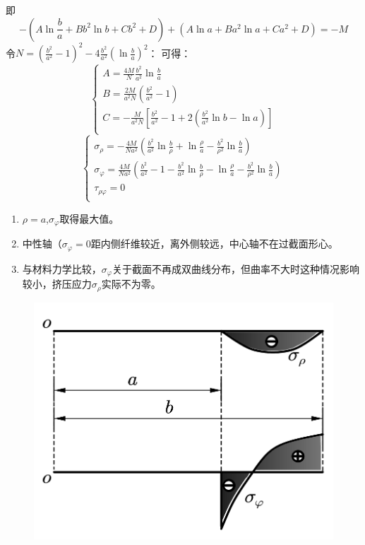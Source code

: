 即\[-\left( A\ln \frac{b}{a}+Bb^2\ln b+Cb^2+D \right) +\left( A\ln a+Ba^2\ln a+Ca^2+D \right) =-M\]
令$N=\left( \frac{b^2}{a^2}-1 \right) ^2-4\frac{b^2}{a^2}\left( \ln \frac{b}{a} \right) ^2$：
可得：\[\begin{cases}
A=\frac{4M}{N}\frac{b^2}{a^2}\ln \frac{b}{a}\\
B=\frac{2M}{a^2N}\left( \frac{b^2}{a^2}-1 \right)\\
C=-\frac{M}{a^2N}\left[ \frac{b^2}{a^2}-1+2\left( \frac{b^2}{a^2}\ln b-\ln a \right) \right]\\
\end{cases}\]
\begin{equation}
\begin{cases}
\sigma _{\rho}=-\frac{4M}{Na^2}\left( \frac{b^2}{a^2}\ln \frac{b}{\rho}+\ln \frac{\rho}{a}-\frac{b^2}{\rho ^2}\ln \frac{b}{a} \right)\\
\sigma _{\varphi}=\frac{4M}{Na^2}\left( \frac{b^2}{a^2}-1-\frac{b^2}{a^2}\ln \frac{b}{\rho}-\ln \frac{\rho}{a}-\frac{b^2}{\rho ^2}\ln \frac{b}{a} \right)\\
\tau _{\rho \varphi}=0\\
\end{cases}
\end{equation}
\begin{note}
	\quad
	\begin{enumerate}
		\item $\rho = a$,$\sigma _{\varphi}$取得最大值。
		\item 中性轴（$\sigma _{\varphi}=0$距内侧纤维较近，离外侧较远，中心轴不在过截面形心。
		\item 与材料力学比较，$\sigma _{\varphi}$关于截面不再成双曲线分布，但曲率不大时这种情况影响较小，挤压应力$\sigma _{\rho}$实际不为零。
	\end{enumerate}
\end{note}
\begin{figure}[H]
	\centering
	\includegraphics[scale=0.7]{figure/4-10.png}
	\caption{}
\end{figure}
